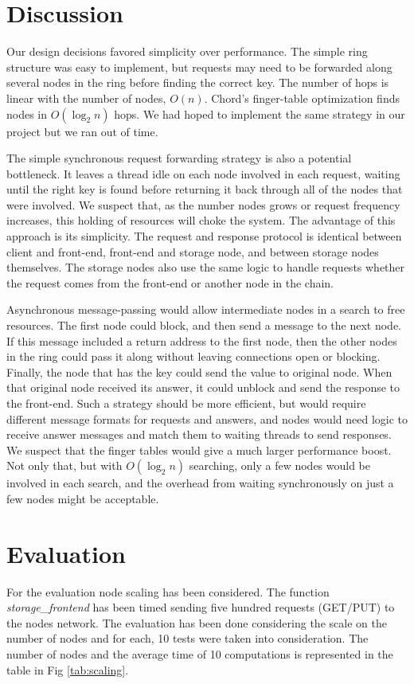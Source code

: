 \documentclass[11pt,conference]{IEEEtran}
\begin{document}
\section{Discussion}

Our design decisions favored simplicity over performance. The simple ring
structure was easy to implement, but requests may need to be forwarded along
several nodes in the ring before finding the correct key. The number of hops is
linear with the number of nodes, $O(n)$. Chord's finger-table
optimization\cite{chord} finds nodes in $O(\log_2 n)$ hops. We had hoped to
implement the same strategy in our project but we ran out of time.

The simple synchronous request forwarding strategy is also a potential
bottleneck. It leaves a thread idle on each node involved in each request,
waiting until the right key is found before returning it back through all of the
nodes that were involved. We suspect that, as the number nodes grows or request
frequency increases, this holding of resources will choke the system. The
advantage of this approach is its simplicity. The request and response protocol
is identical between client and front-end, front-end and storage node, and
between storage nodes themselves. The storage nodes also use the same logic to
handle requests whether the request comes from the front-end or another node in
the chain.

Asynchronous message-passing would allow intermediate nodes in a search to free
resources. The first node could block, and then send a message to the next node.
If this message included a return address to the first node, then the other
nodes in the ring could pass it along without leaving connections open or
blocking. Finally, the node that has the key could send the value to original
node. When that original node received its answer, it could unblock and send the
response to the front-end. Such a strategy should be more efficient, but would
require different message formats for requests and answers, and nodes would need
logic to receive answer messages and match them to waiting threads to send
responses. We suspect that the finger tables would give a much larger
performance boost. Not only that, but with $O(\log_2 n)$ searching, only a few
nodes would be involved in each search, and the overhead from waiting
synchronously on just a few nodes might be acceptable.


\section{Evaluation}
For the evaluation node scaling has been considered. The function \textit{storage\_frontend} has been timed sending five hundred requests (GET/PUT) to the nodes network. The evaluation has been done considering the scale on the number of nodes and for each, 10 tests were taken into consideration.
\newline
The number of nodes and the average time of 10 computations is represented in the table in Fig \ref{tab:scaling}.
\end{document}
